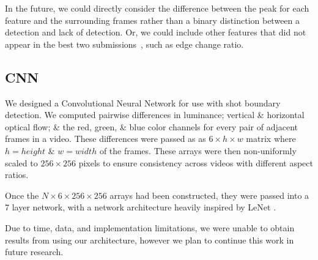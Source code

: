 In the future, we could directly consider the difference between the peak for each feature and the surrounding frames rather than a binary distinction between a detection and lack of detection. Or, we could include other features that did not appear in the best two submissions~\cite{smeaton_video_2010}, such as edge change ratio.

\subsection*{CNN}
We designed a Convolutional Neural Network for use with shot boundary detection. We computed pairwise differences in luminance; vertical \& horizontal optical flow; \& the red, green, \& blue color channels for every pair of adjacent frames in a video. These differences were passed as as $6 \times h \times w$ matrix where $h = height$ \& $w = width$ of the frames. These arrays were then non-uniformly scaled to $256 \times 256$ pixels to ensure consistency across videos with different aspect ratios. 

Once the $N \times 6 \times 256 \times 256$ arrays had been constructed, they were passed into a 7 layer network, with a network architecture heavily inspired by LeNet \cite{lecun1998gradient}.

Due to time, data, and implementation limitations, we were unable to obtain results from using our architecture, however we plan to continue this work in future research. 


